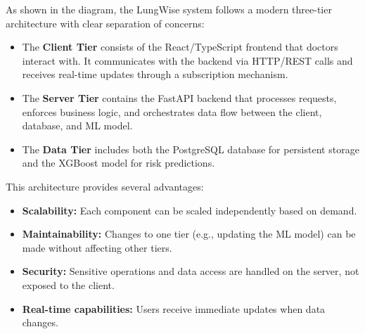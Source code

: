 As shown in the diagram, the LungWise system follows a modern three-tier architecture with clear separation of concerns:

\begin{itemize}
    \item The \textbf{Client Tier} consists of the React/TypeScript frontend that doctors interact with. It communicates with the backend via HTTP/REST calls and receives real-time updates through a subscription mechanism.
    
    \item The \textbf{Server Tier} contains the FastAPI backend that processes requests, enforces business logic, and orchestrates data flow between the client, database, and ML model.
    
    \item The \textbf{Data Tier} includes both the PostgreSQL database for persistent storage and the XGBoost model for risk predictions.
\end{itemize}

This architecture provides several advantages:
\begin{itemize}
    \item \textbf{Scalability:} Each component can be scaled independently based on demand.
    \item \textbf{Maintainability:} Changes to one tier (e.g., updating the ML model) can be made without affecting other tiers.
    \item \textbf{Security:} Sensitive operations and data access are handled on the server, not exposed to the client.
    \item \textbf{Real-time capabilities:} Users receive immediate updates when data changes.
\end{itemize}
